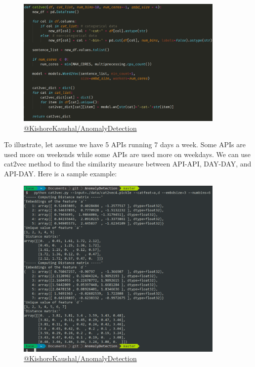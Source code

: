 \vspace{1em}
\begin{figure}[!ht]
    \label{fig:cat2vec-implementation}
    \centering
    \includegraphics[width=0.9\textwidth]{../fig/chapter4/cat2vec.png}
    {\href{https://github.com/KishoreKaushal/AnomalyDetection/blob/master/isolationforest/cat2vec.py}{@KishoreKaushal/AnomalyDetection}}
\end{figure}
\pagebreak

To illustrate, let assume we have 5 APIs running 7 days a week.
Some APIs are used more on weekends while some APIs are used more on weekdays.
We can use cat2vec method to find the similarity measure between API-API, DAY-DAY, and API-DAY.
Here is a sample example:

\vspace{2em}
\begin{figure}[!ht]
    \label{fig:cat2vec-sample-run}
    \centering
    \includegraphics[width=0.9\textwidth]{../fig/chapter4/cat2vec-sample-run.png}
    {\href{https://github.com/KishoreKaushal/AnomalyDetection/blob/master/isolationforest/cat2vec.py}{@KishoreKaushal/AnomalyDetection}}
\end{figure}

